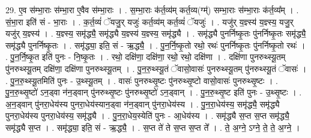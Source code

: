 \documentclass[17pt]{extarticle}
\begin{document}
29. ए॒व स॑म्भा॒राः स॑म्भा॒रा ए॒वैव स॑म्भा॒राः । . स॒म्भा॒राः क॑र्त॒व्य॑म् कर्त॒व्य(ग्म्॑) सम्भा॒राः स॑म्भा॒राः क॑र्त॒व्य᳚म् । . सं॒भा॒रा इति॑ सं - भा॒राः । . क॒र्त॒व्यं॑ ॅयजु॒र् यजुः॑ कर्त॒व्य॑म् कर्त॒व्यं॑ ॅयजुः॑ । . यजु॑र् य॒ज्ञ्स्य॑ य॒ज्ञ्स्य॒ यजु॒र् यजु॑र् य॒ज्ञ्स्य॑ । . य॒ज्ञ्स्य॒ समृ॑द्ध्यै॒ समृ॑द्ध्यै य॒ज्ञ्स्य॑ य॒ज्ञ्स्य॒ समृ॑द्ध्यै । . समृ॑द्ध्यै पुनर्निष्कृ॒तः पु॑नर्निष्कृ॒तः समृ॑द्ध्यै॒ समृ॑द्ध्यै पुनर्निष्कृ॒तः । . समृ॑द्ध्या॒ इति॒ सं - ऋ॒द्ध्यै॒ । . पु॒न॒र्नि॒ष्कृ॒तो रथो॒ रथः॑ पुनर्निष्कृ॒तः पु॑नर्निष्कृ॒तो रथः॑ । . पु॒न॒र्नि॒ष्कृ॒त इति॑ पुनः - नि॒ष्कृ॒तः । . रथो॒ दक्षि॑णा॒ दक्षि॑णा॒ रथो॒ रथो॒ दक्षि॑णा । . दक्षि॑णा पुनरुथ्स्यू॒तम् पु॑नरुथ्स्यू॒तम् दक्षि॑णा॒ दक्षि॑णा पुनरुथ्स्यू॒तम् । . पु॒न॒रु॒थ्स्यू॒तं ॅवासो॒वासः॑ पुनरुथ्स्यू॒तम् पु॑नरुथ्स्यू॒तं ॅवासः॑ । . पु॒न॒रु॒थ्स्यू॒तमिति॑ पुनः - उ॒थ्स्यू॒तम् । . वासः॑ पुनरुथ्सृ॒ष्टः पु॑नरुथ्सृ॒ष्टो वासो॒वासः॑ पुनरुथ्सृ॒ष्टः । . पु॒न॒रु॒थ्सृ॒ष्टो॑ ऽन॒ड्वा न॑न॒ड्वान् पु॑नरुथ्सृ॒ष्टः पु॑नरुथ्सृ॒ष्टो॑ ऽन॒ड्वान् । . पु॒न॒रु॒थ्सृ॒ष्ट इति॑ पुनः - उ॒थ्सृ॒ष्टः । . अ॒न॒ड्वान् पु॑नरा॒धेय॑स्य पुनरा॒धेय॑स्यान॒ड्वा न॑न॒ड्वान् पु॑नरा॒धेय॑स्य । . पु॒न॒रा॒धेय॑स्य॒ समृ॑द्ध्यै॒ समृ॑द्ध्यै पुनरा॒धेय॑स्य पुनरा॒धेय॑स्य॒ समृ॑द्ध्यै । . पु॒न॒रा॒धेय॒स्येति॑ पुनः - आ॒धेय॑स्य । . समृ॑द्ध्यै स॒प्त स॒प्त समृ॑द्ध्यै॒ समृ॑द्ध्यै स॒प्त । . समृ॑द्ध्या॒ इति॒ सं - ऋ॒द्ध्यै॒ । . स॒प्त ते॑ ते स॒प्त स॒प्त ते᳚ । . ते॒ अ॒ग्ने॒ ऽग्ने॒ ते॒ ते॒ अ॒ग्ने॒ । \newline
\end{document}
